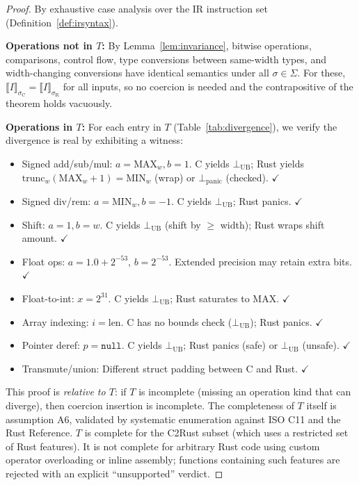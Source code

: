\documentclass[11pt]{article}
\newcommand{\SemConfig}{\sigma}
\newcommand{\SemConfigC}{\sigma_{\mathrm{C}}}
\newcommand{\SemConfigR}{\sigma_{\mathrm{R}}}
\newcommand{\trunc}{\mathrm{trunc}}
\newcommand{\UB}{\bot_{\mathrm{UB}}}
\newcommand{\Panic}{\bot_{\mathrm{panic}}}
\begin{document}
\begin{proof}
By exhaustive case analysis over the IR instruction set (Definition~\ref{def:irsyntax}).

\textbf{Operations not in $T$:} By Lemma~\ref{lem:invariance}, bitwise operations, comparisons, control flow, type conversions between same-width types, and width-changing conversions have identical semantics under all $\SemConfig \in \Sigma$. For these, $\llbracket I \rrbracket_{\SemConfigC} = \llbracket I \rrbracket_{\SemConfigR}$ for all inputs, so no coercion is needed and the contrapositive of the theorem holds vacuously.

\textbf{Operations in $T$:} For each entry in $T$ (Table~\ref{tab:divergence}), we verify the divergence is real by exhibiting a witness:
\begin{itemize}
  \item Signed add/sub/mul: $a = \mathrm{MAX}_w, b = 1$. C yields $\UB$; Rust yields $\trunc_w(\mathrm{MAX}_w + 1) = \mathrm{MIN}_w$ (wrap) or $\Panic$ (checked). $\checkmark$
  \item Signed div/rem: $a = \mathrm{MIN}_w, b = -1$. C yields $\UB$; Rust panics. $\checkmark$
  \item Shift: $a = 1, b = w$. C yields $\UB$ (shift by $\geq$ width); Rust wraps shift amount. $\checkmark$
  \item Float ops: $a = 1.0 + 2^{-53}$, $b = 2^{-53}$. Extended precision may retain extra bits. $\checkmark$
  \item Float-to-int: $x = 2^{31}$. C yields $\UB$; Rust saturates to $\mathrm{MAX}$. $\checkmark$
  \item Array indexing: $i = \mathrm{len}$. C has no bounds check ($\UB$); Rust panics. $\checkmark$
  \item Pointer deref: $p = \texttt{null}$. C yields $\UB$; Rust panics (safe) or $\UB$ (unsafe). $\checkmark$
  \item Transmute/union: Different struct padding between C and Rust. $\checkmark$
\end{itemize}

This proof is \emph{relative to $T$}: if $T$ is incomplete (missing an operation kind that can diverge), then coercion insertion is incomplete. The completeness of $T$ itself is assumption A6, validated by systematic enumeration against ISO C11 and the Rust Reference. $T$ is complete for the C2Rust subset (which uses a restricted set of Rust features). It is not complete for arbitrary Rust code using custom operator overloading or inline assembly; functions containing such features are rejected with an explicit ``unsupported'' verdict.
\end{proof}
\end{document}
